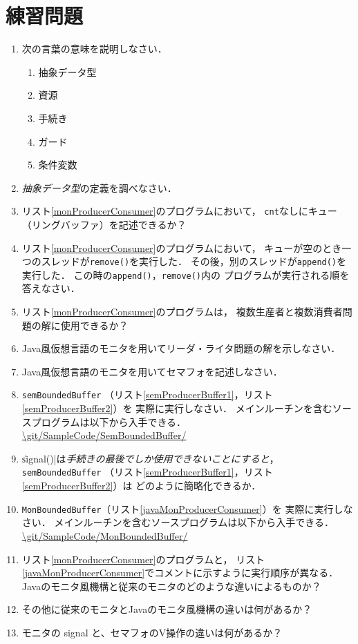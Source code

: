 \section*{練習問題}
\begin{enumerate}
  \renewcommand{\labelenumi}{\ttfamily\arabic{chapter}.\arabic{enumi}}
  \setlength{\leftskip}{1em}
\item 次の言葉の意味を説明しなさい．
  \begin{enumerate}
  \item 抽象データ型
  \item 資源
  \item 手続き
  \item ガード
  \item 条件変数
  \end{enumerate}
\item \emph{抽象データ型}の定義を調べなさい．
\item リスト\ref{monProducerConsumer}のプログラムにおいて，
  \texttt{cnt}なしにキュー（リングバッファ）を記述できるか？
\item リスト\ref{monProducerConsumer}のプログラムにおいて，
  キューが空のとき一つのスレッドが\texttt{remove()}を実行した．
  その後，別のスレッドが\texttt{append()}を実行した．
  この時の\texttt{append()}，\texttt{remove()}内の
  プログラムが実行される順を答えなさい．
\item リスト\ref{monProducerConsumer}のプログラムは，
  複数生産者と複数消費者問題の解に使用できるか？
\item Java風仮想言語のモニタを用いてリーダ・ライタ問題の解を示しなさい．
\item Java風仮想言語のモニタを用いてセマフォを記述しなさい．
\item \texttt{semBoundedBuffer}
  （リスト\ref{semProducerBuffer1}，リスト\ref{semProducerBuffer2}）を
  実際に実行しなさい．
  メインルーチンを含むソースプログラムは以下から入手できる． \\
  \url{\git/SampleCode/SemBoundedBuffer/}
\item \|signal()|は\emph{手続きの最後でしか使用できないことにすると}，
  \texttt{semBoundedBuffer}
  （リスト\ref{semProducerBuffer1}，リスト\ref{semProducerBuffer2}）は
  どのように簡略化できるか．
\item \texttt{MonBoundedBuffer}（リスト\ref{javaMonProducerConsumer}）を
  実際に実行しなさい．
  メインルーチンを含むソースプログラムは以下から入手できる．\\
  \url{\git/SampleCode/MonBoundedBuffer/}
\item リスト\ref{monProducerConsumer}のプログラムと，
  リスト\ref{javaMonProducerConsumer}でコメントに示すように実行順序が異なる．
  Javaのモニタ風機構と従来のモニタのどのような違いによるものか？
\item その他に従来のモニタとJavaのモニタ風機構の違いは何があるか？
\item モニタの signal と、セマフォのV操作の違いは何があるか？
\end{enumerate}
